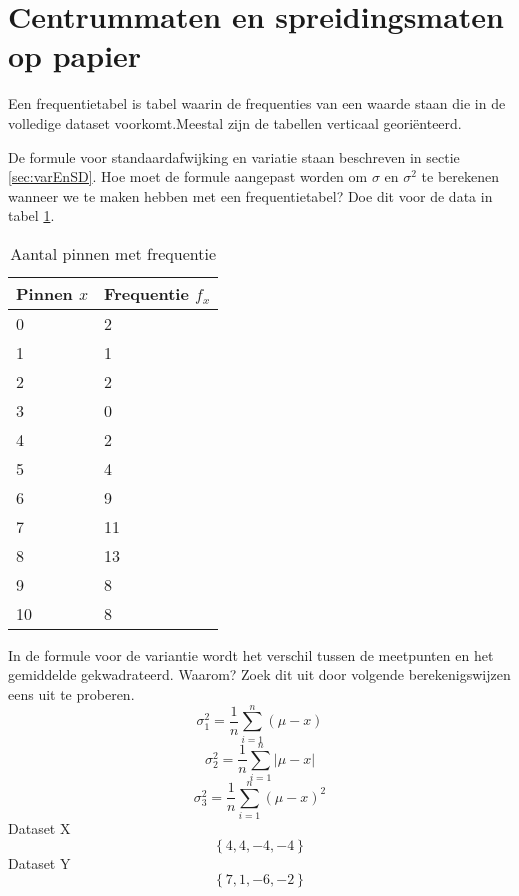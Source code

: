\section{Centrummaten en spreidingsmaten op papier}
\begin{definition}
	Een frequentietabel is tabel waarin de frequenties van een waarde staan die in de volledige dataset voorkomt.Meestal zijn de tabellen verticaal georiënteerd.
\end{definition}

\begin{exercise}
		De formule voor standaardafwijking en variatie staan beschreven in sectie \ref{sec:varEnSD}. 
		Hoe moet de formule aangepast worden om $\sigma$ en $\sigma^{2}$ te berekenen wanneer we te
		maken hebben met een frequentietabel? Doe dit voor de data in tabel \ref{tab:pinfreq}.
\end{exercise}

	\begin{table}
		\centering
		\caption{Aantal pinnen met frequentie}
		\label{tab:pinfreq}
		\begin{tabular}{@{}ll@{}}
			\toprule
			Pinnen $x$ & Frequentie $f_{x}$ \\ \midrule
			0          & 2                  \\
			1          & 1                  \\
			2          & 2                  \\
			3          & 0                  \\
			4          & 2                  \\
			5          & 4                  \\
			6          & 9                  \\
			7          & 11                 \\
			8          & 13                 \\
			9          & 8                  \\ \midrule
			10         & 8                  \\ \bottomrule
		\end{tabular}
	\end{table}
	
\begin{exercise}
		In de formule voor de variantie  wordt het
		verschil tussen de meetpunten en het gemiddelde gekwadrateerd.
		Waarom? Zoek dit uit door volgende berekenigswijzen eens uit te proberen.
		\[ \sigma^{2}_{1} = \frac{1}{n} \sum_{i=1}^{n} (\mu - x) \]
		\[ \sigma^{2}_{2} = \frac{1}{n} \sum_{i=1}^{n} \left| \mu - x\right| \]
		\[ \sigma^{2}_{3} = \frac{1}{n} \sum_{i=1}^{n} (\mu - x)^{2} \]
		Dataset X \[ \left\{ 4,4,-4,-4 \right\} \]
		Dataset Y \[ \left\{ 7,1,-6,-2 \right\} \]
\end{exercise}

